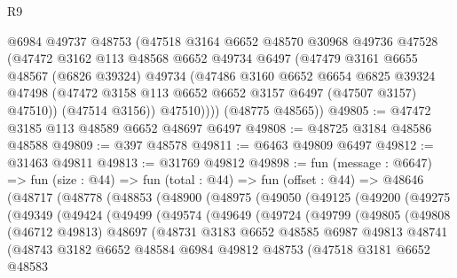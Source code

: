 \begin{lexlean}{R9}
\begin{coremodule}
          @6984
          @49737
          @48753
          (@47518
            @3164
            @6652
            @48570
            @30968
            @49736
            @47528
            (@47472
              @3162
              @113
              @48568
              @6652
              @49734
              @6497
              (@47479
                @3161
                @6655
                @48567
                (@6826 @39324)
                @49734
                (@47486
                  @3160
                  @6652
                  @6654
                  @6825
                  @39324
                  @47498
                  (@47472 @3158 @113 @6652 @6652 @3157 @6497 (@47507 @3157) @47510))
                (@47514 @3156))
              @47510))))
      (@48775 @48565))
@49805 := @47472 @3185 @113 @48589 @6652 @48697 @6497
@49808 := @48725 @3184 @48586 @48588
@49809 := @397 @48578
@49811 := @6463 @49809 @6497
@49812 := @31463 @49811
@49813 := @31769 @49812
@49898 := fun (message : @6647) =>
  fun (size : @44) =>
  fun (total : @44) =>
  fun (offset : @44) =>
  @48646
    (@48717
      (@48778
        (@48853
          (@48900
            (@48975
              (@49050
                (@49125
                  (@49200
                    (@49275
                      (@49349
                        (@49424
                          (@49499
                            (@49574
                              (@49649
                                (@49724
                                  (@49799
                                    (@49805
                                      (@49808
                                        (@46712 @49813)
                                        @48697
                                        (@48731
                                          @3183
                                          @6652
                                          @48585
                                          @6987
                                          @49813
                                          @48741
                                          (@48743
                                            @3182
                                            @6652
                                            @48584
                                            @6984
                                            @49812
                                            @48753
                                            (@47518
                                              @3181
                                              @6652
                                              @48583

\end{coremodule}
\end{lexlean}
